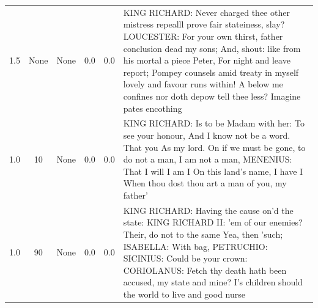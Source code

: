 \documentclass[11pt]{book}
\begin{document}
\begin{longtable}{ccccc p{12cm}}
    1.5 & None & None & 0.0 & 0.0 &
    KING RICHARD:\newline
    Never charged thee other mistress repealll prove fair stateiness, slay?\newline
    LOUCESTER:\newline
    For your own thirst, father conclusion dead my sons;\newline
    And, shout: like from his mortal a piece Peter,\newline
    For night and leave report;\newline
    Pompey counsels amid treaty in myself lovely and favour runs within!\newline
    A below me confines nor doth depow tell thee less?\newline
    Imagine pates encothing\\
    
    1.0 & 10 & None & 0.0 & 0.0 &
    KING RICHARD:\newline
    Is to be\newline
    Madam with her:\newline
    To see your honour,\newline
    And I know not be a word.\newline
    That you\newline
    As my lord.\newline
    On if we must be gone, to do not a man, I am not a man,\newline
    MENENIUS:\newline
    That I will I am I\newline
    On this land's name,\newline
    I have I\newline
    When thou dost thou art a man of you, my father'\\
    
    1.0 & 90 & None & 0.0 & 0.0 &
    KING RICHARD:\newline
    Having the cause on'd the state:\newline
    KING RICHARD II:\newline
    'em of our enemies?\newline
    Their, do not to the same\newline
    Yea, then 'such;\newline
    ISABELLA:\newline
    With bag,\newline
    PETRUCHIO:\newline
    SICINIUS:\newline
    Could be your crown:\newline
    CORIOLANUS:\newline
    Fetch thy death hath been accused, my state and mine?\newline
    I's children should the world to live and good nurse\\
    

\end{longtable}
\end{document}
